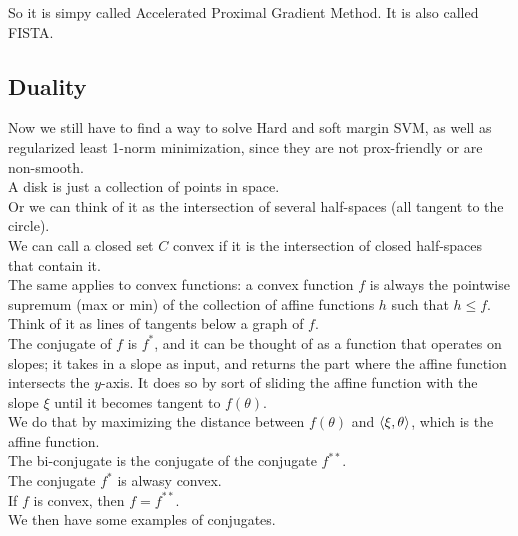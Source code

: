 \documentclass[12pt]{article}
\begin{document}
So it is simpy called Accelerated Proximal 
Gradient Method.
It is also called FISTA. \\

\newpage

\subsection*{Duality}

Now we still have to find a way to solve
Hard and soft margin SVM, as well as regularized
least 1-norm minimization,
since they are not prox-friendly or are
non-smooth. \\

A disk is just a collection of points in space. \\

Or we can think of it as the intersection of
several half-spaces (all tangent to the circle). \\

We can call a closed set $C$
convex if it is the intersection of
closed half-spaces that contain it. \\

The same applies to convex functions:
a convex function $f$ is always the
pointwise supremum (max or min) of the
collection of affine functions $h$
such that $h \leq f$. \\
Think of it as lines of tangents below a graph
of $f$. \\

The conjugate of $f$ is $f^*$,
and it can be thought of as a function that 
operates on slopes;
it takes in a slope as input, and returns
the part where the affine function
intersects the $y$-axis.
It does so by sort of sliding the affine
function with the slope $\xi$
until it becomes tangent to $f(\theta)$. \\
We do that by maximizing the distance
between $f(\theta)$
and $\left\langle \xi, \theta \right\rangle$, 
which is the affine function. \\

The bi-conjugate is the conjugate of the
conjugate $f^{**}$. \\

The conjugate $f^*$ is alwasy convex. \\

If $f$ is convex, then $f = f^{**}$. \\

We then have some examples of conjugates. \\
\end{document}
